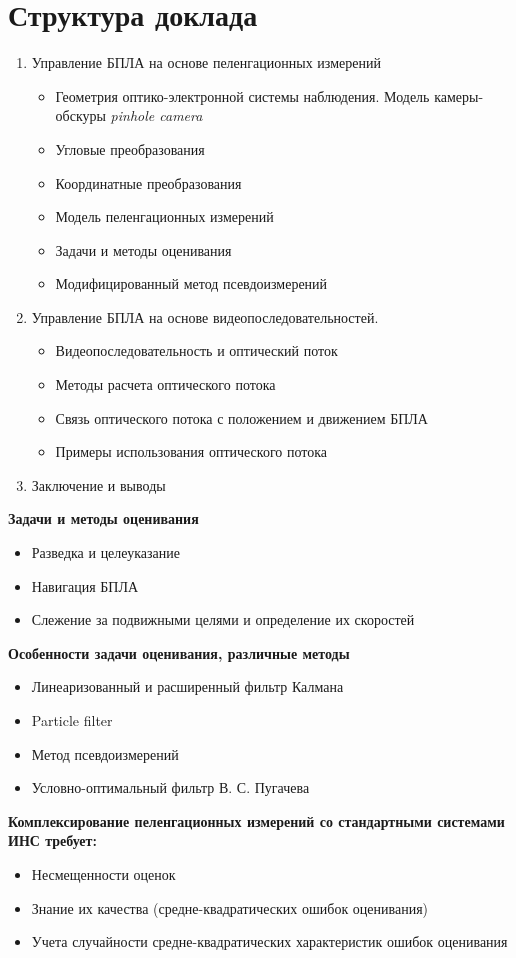 \section*{Структура доклада}
\begin{enumerate}
\item
Управление БПЛА на основе пеленгационных измерений
\begin{itemize}
\item Геометрия оптико-электронной системы наблюдения. Модель камеры-обскуры {\it pinhole camera}
\item Угловые преобразования
\item Координатные преобразования
\item Модель пеленгационных измерений
\item Задачи и методы оценивания
\item Модифицированный метод псевдоизмерений
\end{itemize}
\item Управление БПЛА на основе видеопоследовательностей.
\begin{itemize}
\item Видеопоследовательность и оптический поток
\item Методы расчета оптического потока
\item Связь оптического потока с положением и движением БПЛА \item Примеры использования оптического потока
\end{itemize}
\item Заключение и выводы
\end{enumerate} 

{\bf Задачи и методы оценивания}
\begin{itemize}\item Разведка и целеуказание
\item Навигация БПЛА
\item Слежение за подвижными целями и определение их скоростей
\end{itemize}

{\bf Особенности задачи оценивания, различные методы}
\begin{itemize}
\item Линеаризованный и расширенный фильтр Калмана
\item Particle filter
\item Метод псевдоизмерений
\item Условно-оптимальный фильтр В. С. Пугачева
\end{itemize}

{\bf Комплексирование пеленгационных измерений со стандартными системами ИНС требует:}

\begin{itemize}
\item Несмещенности оценок
\item Знание их качества (средне-квадратических ошибок оценивания)
\item Учета случайности средне-квадратических характеристик ошибок оценивания
\end{itemize}





%


